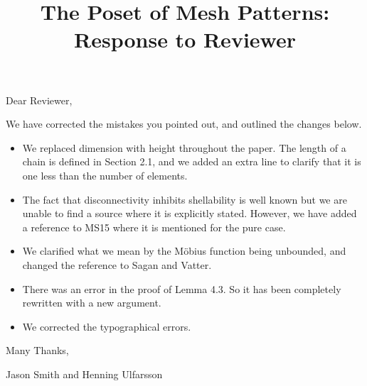 \documentclass{article}
\title{The Poset of Mesh Patterns:\\ Response to Reviewer}
\author{}
\date{}
\begin{document}
	\maketitle
	
	Dear Reviewer,

\vskip 20pt

We have corrected the mistakes you pointed out, and outlined the changes below.

\begin{itemize}
\item We replaced dimension with height throughout the paper. The length of a chain is defined in Section 2.1, and we added an extra line to clarify that it is one less than the number of elements.
\item The fact that disconnectivity inhibits shellability is well known but we are unable to find a source where it is explicitly stated. However, we have added a reference to MS15 where it is mentioned for the pure case.
\item We clarified what we mean by the M\"obius function being unbounded, and changed the reference to Sagan and Vatter.
\item There was an error in the proof of Lemma 4.3. So it has been completely rewritten with a new argument.
\item We corrected the typographical errors.
\end{itemize}

\vskip 20pt

Many Thanks,

Jason Smith and Henning Ulfarsson
\end{document}
